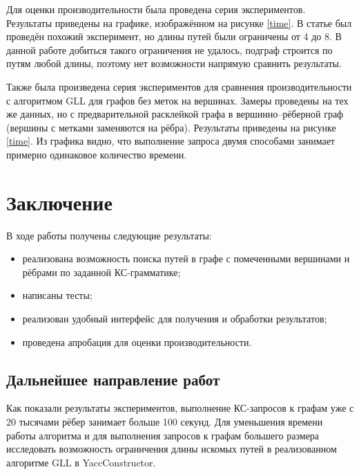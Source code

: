 \documentclass[14pt]{matmex-diploma}
\begin{document}
Для оценки производительности была проведена серия экспериментов. Результаты приведены на графике, изображённом на рисунке \ref{time}. В статье \cite{subgraph} был проведён похожий эксперимент, но длины путей были ограничены от 4 до 8. В данной работе добиться такого ограничения не удалось, подграф строится по путям любой длины, поэтому нет возможности напрямую сравнить результаты.

Также была произведена серия экспериментов для сравнения производительности с алгоритмом GLL для графов без меток на вершинах. Замеры проведены на тех же данных, но с предварительной расклейкой графа в вершинно--рёберной граф (вершины с метками заменяются на рёбра). Результаты приведены на рисунке \ref{time}. Из графика видно, что выполнение запроса двумя способами занимает примерно одинаковое количество времени.

\section{Заключение}
В ходе работы получены следующие результаты:
\begin{itemize}
    \item реализована возможность поиска путей в графе с помеченными вершинами и рёбрами по заданной КС-грамматике;
    \item написаны тесты;
    \item реализован удобный интерфейс для получения и обработки результатов;
    \item проведена апробация для оценки производительности.
\end{itemize}

\subsection{Дальнейшее направление работ}

Как показали результаты экспериментов, выполнение КС-запросов к графам уже с 20 тысячами рёбер занимает больше 100 секунд. Для уменьшения времени работы алгоритма и для выполнения запросов к графам большего размера исследовать возможность ограничения длины искомых путей в реализованном алгоритме GLL в YaccConstructor.

\setmonofont[Mapping=tex-text]{CMU Typewriter Text}


\end{document}
